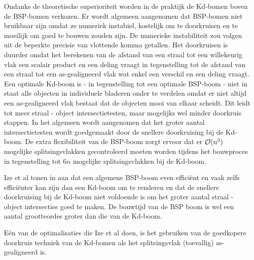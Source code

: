 Ondanks de theoretische superioriteit worden in de praktijk de Kd-bomen boven de BSP-bomen verkozen.
Er wordt algemeen aangenomen dat BSP-bomen niet bruikbaar zijn omdat ze numeriek instabiel, kostelijk om te doorkruisen en te moeilijk om goed te bouwen zouden zijn.
De numerieke instabiliteit zou volgen uit de beperkte precisie van vlottende komma getallen.  
Het doorkruisen is duurder omdat het berekenen van de afstand van een straal tot een willekeurig vlak een scalair product en een deling vraagt in tegenstelling tot de afstand van een straal tot een as-gealigneerd vlak wat enkel een verschil en een deling vraagt.
Een optimale Kd-boom is - in tegenstelling tot een optimale BSP-boom - niet in staat alle objecten in individuele bladeren onder te verdelen omdat er niet altijd een as-gealigneerd vlak bestaat dat de objecten mooi van elkaar scheidt.  
Dit leidt tot meer straal - object intersectietesten, maar mogelijks wel minder doorkruis stappen.
In het algemeen wordt aangenomen dat het groter aantal intersectietesten wordt goedgemaakt door de snellere doorkruising bij de Kd-boom.
De extra flexibiliteit van de BSP-boom zorgt ervoor dat er $\mathcal{O}(n^3)$ mogelijke splitsingsvlakken gecontroleerd moeten worden tijdens het bouwproces in tegenstelling tot $6n$ mogelijke splitsingsvlakken bij de Kd-boom.


Ize et al tonen in \cite{Ize} aan dat een algemene BSP-boom even efficiënt en vaak zelfs efficiënter kan zijn dan een Kd-boom om te renderen en dat de snellere doorkruising bij de Kd-boom niet voldoende is om het groter aantal straal - object intersecties goed te maken.
De bouwtijd van de BSP boom is wel een aantal grootteordes groter dan die van de Kd-boom. 

Eén van de optimalisaties die Ize et al doen, is het gebruiken van de goedkopere doorkruis techniek van de Kd-bomen als het splitsingsvlak (toevallig) as-gealigneerd is. 

